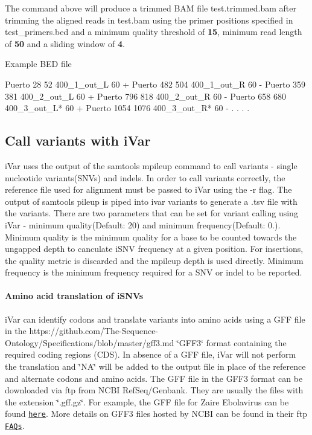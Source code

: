 The command above will produce a trimmed B\+AM file test.\+trimmed.\+bam after trimming the aligned reads in test.\+bam using the primer positions specified in test\+\_\+primers.\+bed and a minimum quality threshold of {\bfseries 15}, minimum read length of {\bfseries 50} and a sliding window of {\bfseries 4}.

Example B\+ED file


\begin{DoxyCode}
Puerto  28  52  400\_1\_out\_L 60  +
Puerto  482 504 400\_1\_out\_R 60  -
Puerto  359 381 400\_2\_out\_L 60  +
Puerto  796 818 400\_2\_out\_R 60  -
Puerto  658 680 400\_3\_out\_L*    60  +
Puerto  1054    1076    400\_3\_out\_R*    60  -
.
.
.
.
\end{DoxyCode}
\hypertarget{manualpage_autotoc_md17}{}\subsection{Call variants with i\+Var}\label{manualpage_autotoc_md17}
i\+Var uses the output of the {\ttfamily samtools mpileup} command to call variants -\/ single nucleotide variants(\+S\+N\+Vs) and indels. In order to call variants correctly, the reference file used for alignment must be passed to i\+Var using the {\ttfamily -\/r} flag. The output of {\ttfamily samtools pileup} is piped into {\ttfamily ivar variants} to generate a .tsv file with the variants. There are two parameters that can be set for variant calling using i\+Var -\/ minimum quality(\+Default\+: 20) and minimum frequency(Default\+: 0.). Minimum quality is the minimum quality for a base to be counted towards the ungapped depth to canculate i\+S\+NV frequency at a given position. For insertions, the quality metric is discarded and the mpileup depth is used directly. Minimum frequency is the minimum frequency required for a S\+NV or indel to be reported.

\paragraph*{Amino acid translation of i\+S\+N\+Vs}

i\+Var can identify codons and translate variants into amino acids using a G\+FF file in the https\+://github.com/\+The-\/\+Sequence-\/\+Ontology/\+Specifications/blob/master/gff3.\+md \char`\"{}\+G\+F\+F3\char`\"{} format containing the required coding regions (C\+DS). In absence of a G\+FF file, i\+Var will not perform the translation and \char`\"{}\+N\+A\char`\"{} will be added to the output file in place of the reference and alternate codons and amino acids. The G\+FF file in the G\+F\+F3 format can be downloaded via ftp from N\+C\+BI Ref\+Seq/\+Genbank. They are usually the files with the extension \char`\"{}.\+gff.\+gz\char`\"{}. For example, the G\+FF file for Zaire Ebolavirus can be found \href{ftp://ftp.ncbi.nlm.nih.gov/genomes/refseq/viral/Zaire_ebolavirus/all_assembly_versions/GCF_000848505.1_ViralProj14703}{\tt here}. More details on G\+F\+F3 files hosted by N\+C\+BI can be found in their ftp \href{https://www.ncbi.nlm.nih.gov/genome/doc/ftpfaq/}{\tt F\+A\+Qs}.

